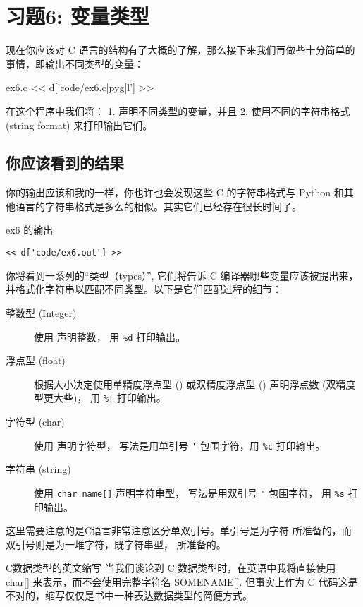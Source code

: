 \chapter{习题6: 变量类型}

现在你应该对 C 语言的结构有了大概的了解，那么接下来我们再做些十分简单的事情，即输出不同类型的变量：

\begin{code}{ex6.c}
<< d['code/ex6.c|pyg|l'] >>
\end{code}

在这个程序中我们将：
1. 声明不同类型的变量，并且
2. 使用不同的字符串格式(string format)  来打印输出它们。


\section{你应该看到的结果}

你的输出应该和我的一样，你也许也会发现这些 C 的字符串格式与 Python 和其他语言的字符串格式是多么的相似。其实它们已经存在很长时间了。

\begin{code}{ex6 的输出}
\begin{lstlisting}
<< d['code/ex6.out'] >>
\end{lstlisting}
\end{code}

你将看到一系列的“类型（types）”, 它们将告诉 C 编译器哪些变量应该被提出来，并格式化字符串以匹配不同类型。以下是它们匹配过程的细节：

\begin{description}
\item[整数型 (Integer) ] 使用  声明整数， 用 \verb|%d| 打印输出。
\item[浮点型 (float)] 根据大小决定使用单精度浮点型 () 或双精度浮点型 () 声明浮点数 (双精度型更大些)， 用 \verb|%f| 打印输出。
\item[字符型 (char)] 使用  声明字符型， 写法是用单引号 \verb|'| 包围字符，用 \verb|%c| 打印输出。
\item[字符串 (string)] 使用 \verb|char name[]| 声明字符串型， 写法是用双引号 \verb|"| 包围字符， 用 \verb|%s| 打印输出。 
\end{description}

这里需要注意的是C语言非常注意区分单双引号。单引号是为字符  所准备的，而双引号则是为一堆字符，既字符串型，  所准备的。

\begin{aside}{C数据类型的英文缩写}
当我们谈论到 C 数据类型时，在英语中我将直接使用 char[] 来表示，而不会使用完整字符名 SOMENAME[]. 但事实上作为 C 代码这是不对的，缩写仅仅是书中一种表达数据类型的简便方式。
\end{aside}

